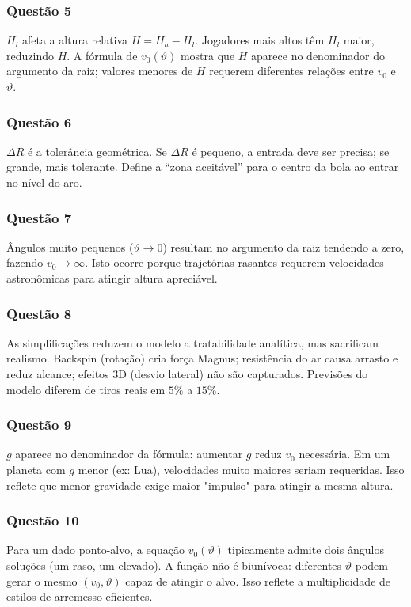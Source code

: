 \documentclass[12pt,a4paper]{article}
\begin{document}
\subsubsection{Questão 5}
$H_l$ afeta a altura relativa $H = H_a - H_l$. Jogadores mais altos têm $H_l$ maior, reduzindo $H$. A fórmula de $v_0(\vartheta)$ mostra que $H$ aparece no denominador do argumento da raiz; valores menores de $H$ requerem diferentes relações entre $v_0$ e $\vartheta$.

\subsubsection{Questão 6}
$\Delta R$ é a tolerância geométrica. Se $\Delta R$ é pequeno, a entrada deve ser precisa; se grande, mais tolerante. Define a ``zona aceitável'' para o centro da bola ao entrar no nível do aro.

\subsubsection{Questão 7}
Ângulos muito pequenos ($\vartheta \to 0$) resultam no argumento da raiz tendendo a zero, fazendo $v_0 \to \infty$. Isto ocorre porque trajetórias rasantes requerem velocidades astronômicas para atingir altura apreciável.

\subsubsection{Questão 8}
As simplificações reduzem o modelo a tratabilidade analítica, mas sacrificam realismo. Backspin (rotação) cria força Magnus; resistência do ar causa arrasto e reduz alcance; efeitos 3D (desvio lateral) não são capturados. Previsões do modelo diferem de tiros reais em $5\%$ a $15\%$.

\subsubsection{Questão 9}
$g$ aparece no denominador da fórmula: aumentar $g$ reduz $v_0$ necessária. Em um planeta com $g$ menor (ex: Lua), velocidades muito maiores seriam requeridas. Isso reflete que menor gravidade exige maior "impulso" para atingir a mesma altura.

\subsubsection{Questão 10}
Para um dado ponto-alvo, a equação $v_0(\vartheta)$ tipicamente admite dois ângulos soluções (um raso, um elevado). A função não é biunívoca: diferentes $\vartheta$ podem gerar o mesmo $(v_0, \vartheta)$ capaz de atingir o alvo. Isso reflete a multiplicidade de estilos de arremesso eficientes.
\end{document}
